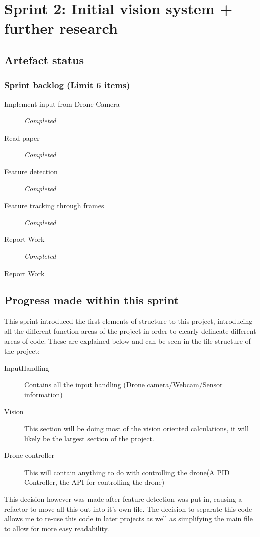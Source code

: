 \section{Sprint 2: Initial vision system + further research}
\subsection{Artefact status}
\subsubsection{Sprint backlog (Limit 6 items)}
\begin{description}
	\item[Implement input from Drone Camera] \em{Completed}
	\item[Read paper] \em{Completed}
	\item[Feature detection] \em{Completed}
	\item[Feature tracking through frames] \em{Completed}
	\item[Report Work] \em{Completed}
	\item[Report Work] 
\end{description}

\subsection{Progress made within this sprint}
This sprint introduced the first elements of structure to this project, introducing all the different function areas of the project in order to clearly delineate different areas of code. These are explained below and can be seen in the file structure of the project: 
\begin{description}
\item[InputHandling] Contains all the input handling (Drone camera/Webcam/Sensor information)
\item[Vision] This section will be doing most of the vision oriented calculations, it will likely be the largest section of the project.
\item[Drone controller] This will contain anything to do with controlling the drone(A PID Controller, the API for controlling the drone)
\end{description}

This decision however was made after feature detection was put in, causing a refactor to move all this out into it's own file. The decision to separate this code allows me to re-use this code in later projects as well as simplifying the main file to allow for more easy readability.


